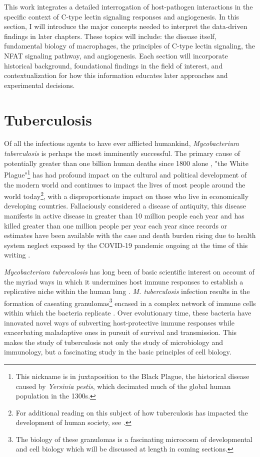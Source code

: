 This work integrates a detailed interrogation of host-pathogen interactions in the specific context of C-type lectin signaling responses and angiogenesis. In this section, I will introduce the major concepts needed to interpret the data-driven findings in later chapters. These topics will include: the disease itself, fundamental biology of macrophages, the principles of C-type lectin signaling, the NFAT signaling pathway, and angiogenesis. Each section will incorporate historical background, foundational findings in the field of interest, and contextualization for how this information educates later approaches and experimental decisions.

\section{Tuberculosis}\label{tuberculosis}

Of all the infectious agents to have ever afflicted humankind, \textit{Mycobacterium tuberculosis} is perhaps the most imminently successful. The primary cause of potentially greater than one billion human deaths since 1800 alone \citep{Paulson2013, Murray2004}, "the White Plague"\footnote{This nickname is in juxtaposition to the Black Plague, the historical disease caused by \textit{Yersinia pestis}, which decimated much of the global human population in the 1300s.} has had profound impact on the cultural and political development of the modern world and continues to impact the lives of most people around the world today\footnote{For additional reading on this subject of how tuberculosis has impacted the development of human society, see \citep{Chalke1962, Dubos1987}.}, with a disproportionate impact on those who live in economically developing countries. Fallaciously considered a disease of antiquity, this disease manifests in active disease in greater than 10 million people each year and has killed greater than one million people per year each year since records or estimates have been available \citep{WHO2021} with the case and death burden rising due to health system neglect exposed by the COVID-19 pandemic ongoing at the time of this writing \citep{Pai2022}. 

\textit{Mycobacterium tuberculosis} has long been of basic scientific interest on account of the myriad ways in which it undermines host immune responses to establish a replicative niche within the human lung \citep{Baxt2013, Yu2019, Nguyen2009, Stanley2003, Monack2004, Hmama2015}. \textit{M. tuberculosis} infection results in the formation of caseating granulomas\footnote{The biology of these granulomas is a fascinating microcosm of developmental and cell biology which will be discussed at length in coming sections.} encased in a complex network of immune cells within which the bacteria replicate \citep{Pagan2018}. Over evolutionary time, these bacteria have innovated novel ways of subverting host-protective immune responses while exacerbating maladaptive ones in pursuit of survival and transmission\citep{Ernst2012, Rahman2020, Chandra2022}. This makes the study of tuberculosis not only the study of microbiology and immunology, but a fascinating study in the basic principles of cell biology. 

